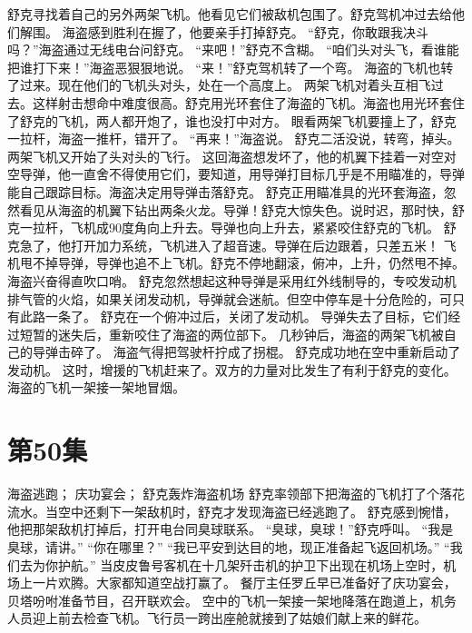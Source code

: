 \documentclass[a4paper,12pt,UTF8,twoside]{ctexbook}
\begin{document}
        舒克寻找着自己的另外两架飞机。他看见它们被敌机包围了。舒克驾机冲过去给他们解围。 
        海盗感到胜利在握了，他要亲手打掉舒克。 
        “舒克，你敢跟我决斗吗？”海盗通过无线电台问舒克。 
        “来吧！”舒克不含糊。 
        “咱们头对头飞，看谁能把谁打下来！”海盗恶狠狠地说。 
        “来！”舒克驾机转了一个弯。 
        海盗的飞机也转了过来。现在他们的飞机头对头，处在一个高度上。 
        两架飞机对着头互相飞过去。这样射击想命中难度很高。舒克用光环套住了海盗的飞机。海盗也用光环套住了舒克的飞机，两人都开炮了，谁也没打中对方。 
        眼看两架飞机要撞上了，舒克一拉杆，海盗一推杆，错开了。 
        “再来！”海盗说。 
        舒克二活没说，转弯，掉头。 
        两架飞机又开始了头对头的飞行。 
        这回海盗想发坏了，他的机翼下挂着一对空对空导弹，他一直舍不得使用它们，要知道，用导弹打目标几乎是不用瞄准的，导弹能自己跟踪目标。海盗决定用导弹击落舒克。 
        舒克正用瞄准具的光环套海盗，忽然看见从海盗的机翼下钻出两条火龙。导弹！舒克大惊失色。说时迟，那时快，舒克一拉杆，飞机成90度角向上升去。导弹也向上升去，紧紧咬住舒克的飞机。 
        舒克急了，他打开加力系统，飞机进入了超音速。导弹在后边跟着，只差五米！ 
        飞机甩不掉导弹，导弹也追不上飞机。舒克不停地翻滚，俯冲，上升，仍然甩不掉。 
        海盗兴奋得直吹口哨。 
        舒克忽然想起这种导弹是采用红外线制导的，专咬发动机排气管的火焰，如果关闭发动机，导弹就会迷航。但空中停车是十分危险的，可只有此路一条了。 
        舒克在一个俯冲过后，关闭了发动机。 
        导弹失去了目标，它们经过短暂的迷失后，重新咬住了海盗的两位部下。 
        几秒钟后，海盗的两架飞机被自己的导弹击碎了。 
        海盗气得把驾驶杆拧成了拐棍。 
        舒克成功地在空中重新启动了发动机。 
        这时，增援的飞机赶来了。双方的力量对比发生了有利于舒克的变化。 
        海盗的飞机一架接一架地冒烟。   \chapter{第50集} 
        海盗逃跑； 
        庆功宴会； 
        舒克轰炸海盗机场   
        舒克率领部下把海盗的飞机打了个落花流水。当空中还剩下一架敌机时，舒克才发现海盗已经逃跑了。 
        舒克感到惋惜，他把那架敌机打掉后，打开电台同臭球联系。 
        “臭球，臭球！”舒克呼叫。 
        “我是臭球，请讲。” 
        “你在哪里？” 
        “我已平安到达目的地，现正准备起飞返回机场。” 
        “我们去为你护航。” 
        当皮皮鲁号客机在十几架歼击机的护卫下出现在机场上空时，机场上一片欢腾。大家都知道空战打赢了。 
        餐厅主任罗丘早已准备好了庆功宴会，贝塔吩咐准备节目，召开联欢会。 
        空中的飞机一架接一架地降落在跑道上，机务人员迎上前去检查飞机。飞行员一跨出座舱就接到了姑娘们献上来的鲜花。 
\end{document}

